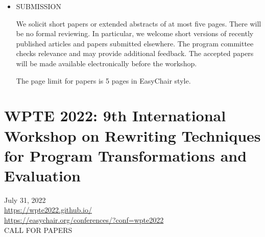 \documentclass[prodmode,acmtecs]{acmsmall} %
\begin{document}
\begin{itemize}
\item  SUBMISSION 
 
  We solicit short papers or extended abstracts of at most five pages. There will be no formal reviewing. In particular, we welcome short versions of recently published articles and papers submitted elsewhere. The program committee checks relevance and may provide additional feedback. The accepted papers will be made available electronically before the workshop. 
 
  The page limit for papers is 5 pages in EasyChair style.  
 
\end{itemize}\section{WPTE 2022: 9th International Workshop on Rewriting Techniques for Program Transformations and Evaluation}\label{WPTE2022}  July 31, 2022\\ 
  \href{https://wpte2022.github.io/}{https://wpte2022.github.io/}\\ 
  \href{https://easychair.org/conferences/?conf=wpte2022}{https://easychair.org/conferences/?conf=wpte2022}\\ 
CALL FOR PAPERS 
\end{document}

